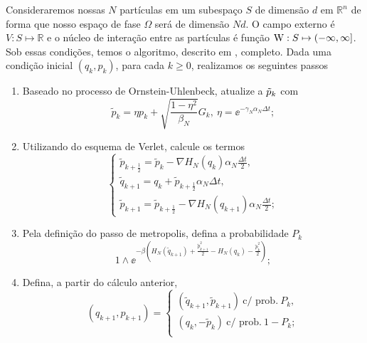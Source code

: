 \documentclass[12pt]{report}
\begin{document}
Consideraremos nossas $N$ partículas em um subespaço $S$ de dimensão $d$ em $\mathbb{R}^n$ de forma que nosso espaço de fase $\Omega$ será de dimensão $Nd$. O campo externo é $V : S \mapsto \mathbb{R}$ e o núcleo de interação entre as partículas é função $\operatorname{W} : S \mapsto (-\infty, \infty]$. Sob essas condições, temos o algoritmo, descrito em \cite{Chafa2018}, completo. Dada uma condição inicial $(q_k, p_k)$, para cada $k\geq0$, realizamos os seguintes passos
\begin{enumerate}
	\item Baseado no processo de Ornstein-Uhlenbeck, atualize a $\tilde{p}_k$ com
	\begin{equation}
		\tilde{p}_k = \eta p_k + \sqrt{\frac{1-\eta^2}{\beta_N}} G_k, \ \eta = \ee^{-\gamma_N \alpha_N \Delta t};
		\label{Equation: Alg Mehler}
	\end{equation}
	\item Utilizando do esquema de Verlet, calcule os termos
	\begin{equation}
		\begin{cases}
			\tilde{p}_{k+\frac{1}{2}} = \tilde{p}_k - \nabla H_N(q_k) \alpha_N \frac{\Delta t}{2}, \\
			\tilde{q}_{k+1} = q_k + \tilde{p}_{k + \frac{1}{2}} \alpha_N \Delta t, \\
			\tilde{p}_{k+1} = \tilde{p}_{k+\frac{1}{2}} - \nabla H_N(q_{k+1}) \alpha_N \frac{\Delta t}{2};
			\label{Equation: Alg Verlet}
		\end{cases}
	\end{equation}
	\item Pela definição do passo de metropolis, defina a probabilidade $P_k$
	\begin{equation}
		1 \wedge \ee^{ -\beta \left( H_N(\tilde{q}_{k+1}) + \frac{\tilde{p}^2_{k+1}}{2} - H_N(q_k) - \frac{\tilde{p}^2_k}{2} \right) };
		\label{Equação: Alg Pk}
	\end{equation}
	\item Defina, a partir do cálculo anterior, 
	\begin{equation}
		(q_{k+1}, p_{k+1}) = 
		\begin{cases}
			(\tilde{q}_{k+1}, \tilde{p}_{k+1}) \ \text{c/ prob.} \ P_k, \\
			(q_k, -\tilde{p}_{k}) \ \text{c/ prob.} \ 1-P_k; \\
		\end{cases}
		\label{Equation: Alg Metro}
	\end{equation}
\end{enumerate}
\end{document}
